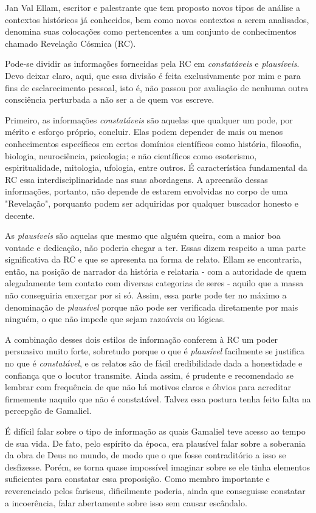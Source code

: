 \documentclass[12pt, oneside,twocolumns, a4paper, brazil]{abntex2}
\begin{document}
Jan Val Ellam\cite{ref1}, escritor e palestrante que tem proposto novos tipos de análise a contextos históricos já conhecidos, bem como novos contextos a serem analisados, denomina suas colocações como pertencentes a um conjunto de conhecimentos chamado Revelação Cósmica (RC).\par
Pode-se dividir as informações fornecidas pela RC em \emph{constatáveis} e \emph{plausíveis}. Devo deixar claro, aqui, que essa divisão é feita exclusivamente por mim e para fins de esclarecimento pessoal, isto é, não passou por avaliação de nenhuma outra consciência perturbada a não ser a de quem vos escreve. \par
Primeiro, as informações \emph{constatáveis} são aquelas que qualquer um pode, por mérito e esforço próprio, concluir. Elas podem depender de mais ou menos conhecimentos específicos em certos domínios científicos como história, filosofia, biologia, neurociência, psicologia; e não científicos como esoterismo, espiritualidade, mitologia, ufologia, entre outros. É característica fundamental da RC essa interdisciplinaridade nas suas abordagens. A apreensão dessas informações, portanto, não depende de estarem envolvidas no corpo de uma "Revelação", porquanto podem ser adquiridas por qualquer buscador honesto e decente.\par
As \emph{plausíveis} são aquelas que mesmo que alguém queira, com a maior boa vontade e dedicação, não poderia chegar a ter. Essas dizem respeito a uma parte significativa da RC e que se apresenta na forma de relato. Ellam se encontraria, então, na posição de narrador da história e relataria - com a autoridade de quem alegadamente tem contato com diversas categorias de seres - aquilo que a massa não conseguiria enxergar por si só. Assim, essa parte pode ter no máximo a denominação de \emph{plausível} porque não pode ser verificada diretamente por mais ninguém, o que não impede que sejam razoáveis ou lógicas.\par
A combinação desses dois estilos de informação conferem à RC um poder persuasivo muito forte, sobretudo porque o que é \emph{plausível} facilmente se justifica no que é \emph{constatável}, e os relatos são de fácil credibilidade dada a honestidade e confiança que o locutor transmite. Ainda assim, é prudente e recomendado se lembrar com frequência de que não há motivos claros e óbvios para acreditar firmemente naquilo que não é constatável. Talvez essa postura tenha feito falta na percepção de Gamaliel. \par
É difícil falar sobre o tipo de informação as quais Gamaliel teve acesso ao tempo de sua vida. De fato, pelo espírito da época, era plausível falar sobre a soberania da obra de Deus no mundo, de modo que o que fosse contraditório a isso se desfizesse. Porém, se torna quase impossível imaginar sobre se ele tinha elementos suficientes para constatar essa proposição. Como membro importante e reverenciado pelos fariseus, dificilmente poderia, ainda que conseguisse constatar a incoerência, falar abertamente sobre isso sem causar escândalo.\par
\end{document}
